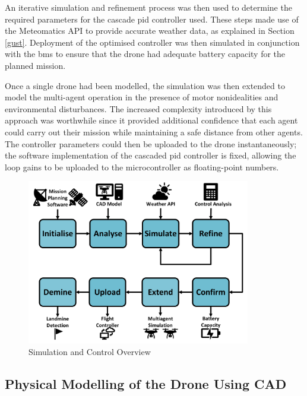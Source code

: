 An iterative simulation and refinement process was then used to determine the required parameters for the cascade \gls{pid} controller used. These steps made use of the Meteomatics API to provide accurate weather data, as explained in Section \ref{gust}. Deployment of the optimised controller was then simulated in conjunction with the \gls{bms} to ensure that the drone had adequate battery capacity for the planned mission. 

Once a single drone had been modelled, the simulation was then extended to model the multi-agent operation in the presence of motor nonidealities and environmental disturbances. The increased complexity introduced by this approach was worthwhile since it provided additional confidence that each agent could carry out their mission while maintaining a safe distance from other agents. The controller parameters could then be uploaded to the drone instantaneously; the software implementation of the cascaded \acrshort{pid} controller is fixed, allowing the loop gains to be uploaded to the microcontroller as floating-point numbers.



\begin{figure}[H]
\centering
\includegraphics[width=0.87\textwidth]{figs/Samuel/Figures/Sim and Control Overview BASIC1 (1) (1).pdf}
\caption{Simulation and Control Overview}
\label{fig:simctrloverview}
\end{figure}





\subsection{Physical Modelling of the Drone Using CAD}
\label{cad}

